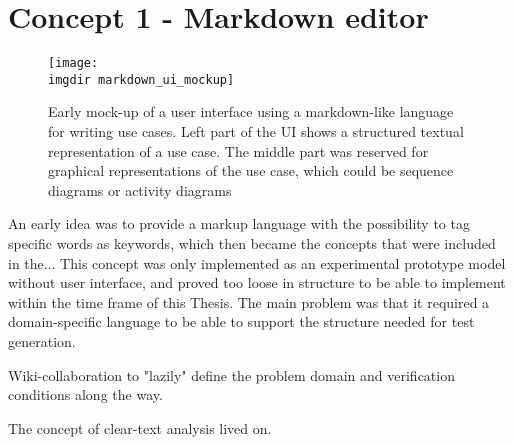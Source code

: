 \section{Concept 1 - Markdown editor}
\begin{figure}[!htbp]
\centering
\texttt{[image: \\imgdir markdown\_ui\_mockup]}
\caption{Early mock-up of a user interface using a markdown-like language for writing use cases. Left part of the UI shows a structured textual representation of a use case. The middle part was reserved for graphical representations of the use case, which could be sequence diagrams or activity diagrams}
\label{fig:markdown_ui_mockup}
\end{figure}
An early idea was to provide a markup language with the possibility to tag specific words as keywords, which then became the concepts that were included in the...
This concept was only implemented as an experimental prototype model without user interface, and proved too loose in structure to be able to implement within the time frame of this Thesis. The main problem was that it required a domain-specific language to be able to support the structure needed for test generation.


Wiki-collaboration to "lazily" define the problem domain and verification conditions along the way.

The concept of clear-text analysis lived on.

